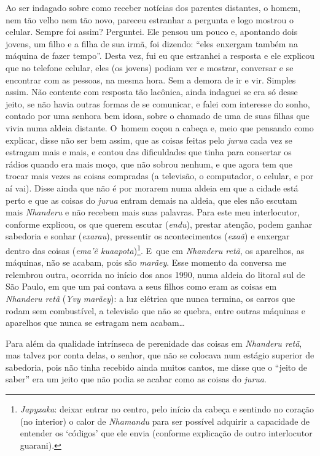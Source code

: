 Ao ser indagado sobre como receber notícias dos parentes distantes, o
homem, nem tão velho nem tão novo, pareceu estranhar a pergunta e logo
mostrou o celular. Sempre foi assim? Perguntei. Ele pensou um pouco e,
apontando dois jovens, um filho e a filha de sua irmã, foi dizendo:
``eles enxergam também na máquina de fazer tempo''. Desta vez, fui eu que
estranhei a resposta e ele explicou que no telefone celular, eles (os
jovens) podiam ver e mostrar, conversar e se encontrar com as pessoas,
na mesma hora. Sem a demora de ir e vir. Simples assim. Não contente
com resposta tão lacônica, ainda indaguei se era só desse jeito, se não
havia outras formas de se comunicar, e falei com interesse do sonho,
contado por uma senhora bem idosa, sobre o chamado de uma de suas
filhas que vivia numa aldeia distante. O~homem coçou a cabeça e, meio
que pensando como explicar, disse não ser bem assim, que as coisas
feitas pelo \emph{jurua} cada vez se estragam mais e mais, e contou das
dificuldades que tinha para consertar os rádios quando era mais moço,
que não sobrou nenhum, e que agora tem que trocar mais vezes as coisas
compradas (a televisão, o computador, o celular, e por aí vai). Disse
ainda que não é por morarem numa aldeia em que a cidade está perto e
que as coisas do \emph{jurua} entram demais na aldeia, que eles não escutam
mais \emph{Nhanderu} e não recebem mais suas palavras. Para este meu
interlocutor, conforme explicou, os que querem escutar (\emph{endu}), prestar
atenção, podem ganhar sabedoria e sonhar (\emph{exarau}), pressentir os
acontecimentos (\emph{exaã}) e enxergar dentro das coisas (\emph{ema'ẽ
kuaapota})\footnote{\emph{Japyxaka}: deixar entrar no centro, pelo início da
cabeça e sentindo no coração (no interior) o calor de \emph{Nhamandu} para ser
possível adquirir a capacidade de entender os ‘códigos’ que ele envia
(conforme explicação de outro interlocutor guarani).}. E~que em
\emph{Nhanderu retã}, os aparelhos, as máquinas, não se acabam, pois são
\emph{marãey}. Esse momento da conversa me relembrou outra, ocorrida no início
dos anos 1990, numa aldeia do litoral sul de São Paulo, em que um pai
contava a seus filhos como eram as coisas em \emph{Nhanderu retã} (\emph{Yvy
marãey}): a luz elétrica que nunca termina, os carros que rodam sem
combustível, a televisão que não se quebra, entre outras máquinas e
aparelhos que nunca se estragam nem acabam\ldots{} 

Para além da qualidade intrínseca de perenidade das coisas em \emph{Nhanderu
retã}, mas talvez por conta delas, o senhor, que não se colocava num
estágio superior de sabedoria, pois não tinha recebido ainda muitos
cantos, me disse que o ``jeito de saber'' era um jeito que não podia se
acabar como as coisas do \emph{jurua}.

